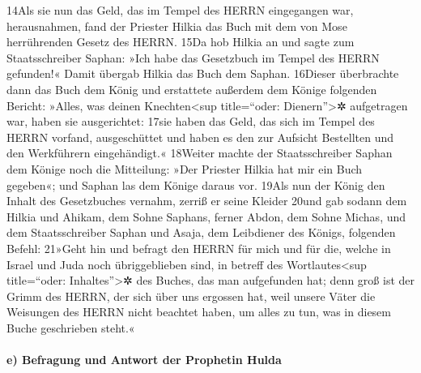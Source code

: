 14Als sie nun das Geld, das im Tempel des HERRN eingegangen war,
herausnahmen, fand der Priester Hilkia das Buch mit dem von Mose
herrührenden Gesetz des HERRN. 15Da hob Hilkia an und sagte zum
Staatsschreiber Saphan: »Ich habe das Gesetzbuch im Tempel des HERRN
gefunden!« Damit übergab Hilkia das Buch dem Saphan. 16Dieser
überbrachte dann das Buch dem König und erstattete außerdem dem Könige
folgenden Bericht: »Alles, was deinen Knechten\textless sup
title=``oder: Dienern''\textgreater✲ aufgetragen war, haben sie
ausgerichtet: 17sie haben das Geld, das sich im Tempel des HERRN
vorfand, ausgeschüttet und haben es den zur Aufsicht Bestellten und den
Werkführern eingehändigt.« 18Weiter machte der Staatsschreiber Saphan
dem Könige noch die Mitteilung: »Der Priester Hilkia hat mir ein Buch
gegeben«; und Saphan las dem Könige daraus vor. 19Als nun der König den
Inhalt des Gesetzbuches vernahm, zerriß er seine Kleider 20und gab
sodann dem Hilkia und Ahikam, dem Sohne Saphans, ferner Abdon, dem Sohne
Michas, und dem Staatsschreiber Saphan und Asaja, dem Leibdiener des
Königs, folgenden Befehl: 21»Geht hin und befragt den HERRN für mich und
für die, welche in Israel und Juda noch übriggeblieben sind, in betreff
des Wortlautes\textless sup title=``oder: Inhaltes''\textgreater✲ des
Buches, das man aufgefunden hat; denn groß ist der Grimm des HERRN, der
sich über uns ergossen hat, weil unsere Väter die Weisungen des HERRN
nicht beachtet haben, um alles zu tun, was in diesem Buche geschrieben
steht.«

\hypertarget{e-befragung-und-antwort-der-prophetin-hulda}{%
\paragraph{e) Befragung und Antwort der Prophetin
Hulda}\label{e-befragung-und-antwort-der-prophetin-hulda}}

